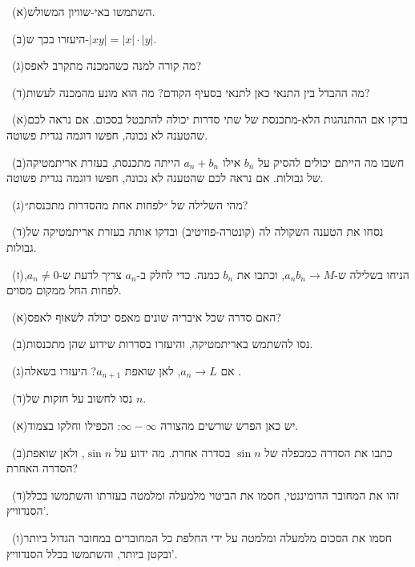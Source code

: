 \documentclass[12pt, a4paper]{article}
\begin{document}
\noindent {}\ (א)\enskip השתמשו באי-שוויון המשולש.\par\smallskip
\noindent {}\ (ב)\enskip היעזרו בכך ש-$|xy|=|x|\cdot|y|$.\par\smallskip
\noindent {}\ (ג)\enskip מה קורה למנה כשהמכנה מתקרב לאפס?\par\smallskip
\noindent {}\ (ד)\enskip מה ההבדל בין התנאי כאן לתנאי בסעיף הקודם? מה הוא מונע מהמכנה לעשות?\par\smallskip
\noindent {}\ (א)\enskip בדקו אם ההתנהגות הלא-מתכנסת של שתי סדרות יכולה להתבטל בסכום. אם נראה לכם שהטענה לא נכונה, חפשו דוגמה נגדית פשוטה.\par\smallskip
\noindent {}\ (ב)\enskip חשבו מה הייתם יכולים להסיק על $b_n$ אילו $a_n+b_n$ הייתה מתכנסת, בעזרת אריתמטיקה של גבולות. אם נראה לכם שהטענה לא נכונה, חפשו דוגמה נגדית פשוטה.\par\smallskip
\noindent {}\ (ג)\enskip מהי השלילה של ״לפחות אחת מהסדרות מתכנסת״?\par\smallskip
\noindent {}\ (ד)\enskip נסחו את הטענה השקולה לה (קונטרה-פוזיטיב) ובדקו אותה בעזרת אריתמטיקה של גבולות.\par\smallskip
\noindent {}\ (ז)\enskip הניחו בשלילה ש-$a_nb_n\to M$, וכתבו את $b_n$ כמנה. כדי לחלק ב-$a_n$ צריך לדעת ש-$a_n\ne0$, לפחות החל ממקום מסוים.\par\smallskip
\noindent {}\ (א)\enskip האם סדרה שכל איבריה שונים מאפס יכולה לשאוף לאפס?\par\smallskip
\noindent {}\ (ב)\enskip נסו להשתמש באריתמטיקה, והיעזרו בסדרות שידוע שהן מתכנסות.\par\smallskip
\noindent {}\ (ג)\enskip אם $a_n\to L$, לאן שואפת $a_{n+1}$? היעזרו בשאלה .\par\smallskip
\noindent {}\ (ד)\enskip נסו לחשוב על חזקות של $n$.\par\smallskip
\noindent {}\ (א)\enskip יש כאן הפרש שורשים מהצורה $\infty-\infty$: הכפילו וחלקו בצמוד.\par\smallskip
\noindent {}\ (ב)\enskip כתבו את הסדרה כמכפלה של $\sin n$ בסדרה אחרת. מה ידוע על $\sin n$, ולאן שואפת הסדרה האחרת?\par\smallskip
\noindent {}\ (ד)\enskip זהו את המחובר הדומיננטי, חסמו את הביטוי מלמעלה ומלמטה בעזרתו והשתמשו בכלל הסנדוויץ'.\par\smallskip
\noindent {}\ (ו)\enskip חסמו את הסכום מלמעלה ומלמטה על ידי החלפת כל המחוברים במחובר הגדול ביותר ובקטן ביותר, והשתמשו בכלל הסנדוויץ'.\par\smallskip
\end{document}

